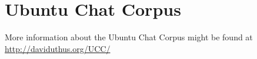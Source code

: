 \documentclass{article} %
\begin{document}


\section*{Ubuntu Chat Corpus \label{sec:ubuntudata}}
More information about the Ubuntu Chat Corpus might be found at \url{http://daviduthus.org/UCC/}
\end{document}
